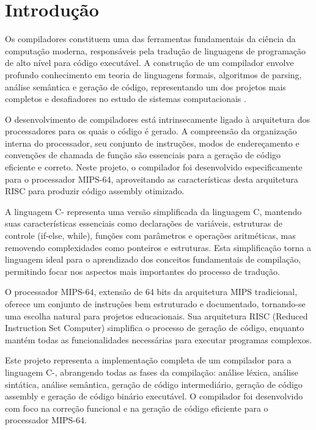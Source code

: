 \documentclass[
	12pt,				%
	oneside,
	a4paper,			%
	english,			%
	french,				%
	spanish,			%
	brazil,				%
	]{abntex2}
\begin{document}
\textual

\chapter{Introdução}

Os compiladores constituem uma das ferramentas fundamentais da ciência da computação moderna, responsáveis pela tradução de linguagens de programação de alto nível para código executável. A construção de um compilador envolve profundo conhecimento em teoria de linguagens formais, algoritmos de parsing, análise semântica e geração de código, representando um dos projetos mais completos e desafiadores no estudo de sistemas computacionais \cite{Aho2007}.

O desenvolvimento de compiladores está intrinsecamente ligado à arquitetura dos processadores para os quais o código é gerado. A compreensão da organização interna do processador, seu conjunto de instruções, modos de endereçamento e convenções de chamada de função são essenciais para a geração de código eficiente e correto. Neste projeto, o compilador foi desenvolvido especificamente para o processador MIPS-64, aproveitando as características desta arquitetura RISC para produzir código assembly otimizado.

A linguagem C- representa uma versão simplificada da linguagem C, mantendo suas características essenciais como declarações de variáveis, estruturas de controle (if-else, while), funções com parâmetros e operações aritméticas, mas removendo complexidades como ponteiros e estruturas. Esta simplificação torna a linguagem ideal para o aprendizado dos conceitos fundamentais de compilação, permitindo focar nos aspectos mais importantes do processo de tradução.

O processador MIPS-64, extensão de 64 bits da arquitetura MIPS tradicional, oferece um conjunto de instruções bem estruturado e documentado, tornando-se uma escolha natural para projetos educacionais. Sua arquitetura RISC (Reduced Instruction Set Computer) simplifica o processo de geração de código, enquanto mantém todas as funcionalidades necessárias para executar programas complexos.

Este projeto representa a implementação completa de um compilador para a linguagem C-, abrangendo todas as fases da compilação: análise léxica, análise sintática, análise semântica, geração de código intermediário, geração de código assembly e geração de código binário executável. O compilador foi desenvolvido com foco na correção funcional e na geração de código eficiente para o processador MIPS-64.
\end{document}
